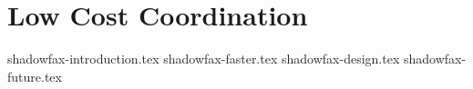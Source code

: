 \chapter{Low Cost Coordination}

 {shadowfax-introduction.tex}
 {shadowfax-faster.tex}
 {shadowfax-design.tex}
 {shadowfax-future.tex}
